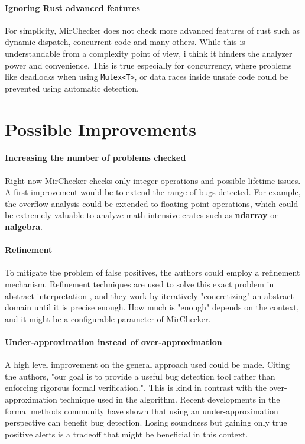 \documentclass{article}
\begin{document}
\paragraph{Ignoring Rust advanced features}
For simplicity, MirChecker does not check more advanced features of rust such as dynamic dispatch, concurrent code and many others. While 
this is understandable from a complexity point of view, i think it hinders the analyzer power and convenience. This is true especially for concurrency, 
where problems like deadlocks when using \texttt{Mutex<T>}, or data races inside unsafe code could be prevented 
using automatic detection.

\section{Possible Improvements}

\paragraph{Increasing the number of problems checked}
Right now MirChecker checks only integer operations and possible lifetime issues. 
A first improvement would be to extend the range  of bugs detected. For example, the overflow 
analysis could be extended to floating point operations, which could be extremely valuable 
to analyze math-intensive crates such as \textbf{ndarray} or \textbf{nalgebra}.

\paragraph{Refinement}
To mitigate the problem of false positives, the authors could employ a refinement mechanism. Refinement techniques are used to solve 
this exact problem in abstract interpretation \cite{gulavani2006counterexample}\cite{bogomolov2017counterexample}, and they work by iteratively "concretizing" an abstract domain  until it is precise enough. 
How much is "enough" depends on the context, and it might be a configurable parameter of MirChecker.
\paragraph{Under-approximation instead of over-approximation}
A high level improvement  on the general approach used could be made. Citing the authors, "our goal is to provide a useful bug detection tool rather
than enforcing rigorous formal verification.". This is kind in contrast with the over-approximation technique used in the algorithm. Recent developments 
in the formal methods community \cite{o2019incorrectness}\cite{murray2021incremental}\cite{le2022finding} have shown that using an under-approximation perspective can benefit bug detection. Losing soundness but gaining only true positive  alerts 
is a tradeoff that might be beneficial in this context.


\end{document}
